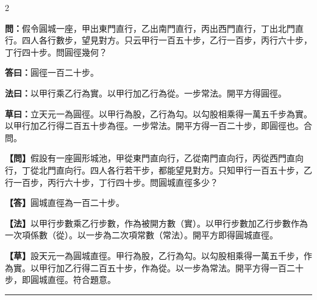 \documentclass[11pt,a4paper]{article}
\newcommand{\longline}{\noindent\rule{\textwidth}{0.4pt}}
\newcommand{\wenC}[1]{\par\noindent\textbf{\textcolor{probcolor}{問：}}{#1}\par}
\newcommand{\daC}[1]{\par\noindent\textbf{\textcolor{anscolor}{答曰：}}{#1}\par}
\newcommand{\fayueC}[1]{\par\noindent\textbf{\textcolor{methodcolor}{法曰：}}{#1}\par}
\newcommand{\caoyueC}[1]{\par\noindent\textbf{草曰：}{#1}\par}
\newcommand{\wenM}[1]{\par\noindent\textbf{\textcolor{probcolor}{【問】}}{#1}\par}
\newcommand{\daM}[1]{\par\noindent\textbf{\textcolor{anscolor}{【答】}}{#1}\par}
\newcommand{\fayueM}[1]{\par\noindent\textbf{\textcolor{methodcolor}{【法】}}{#1}\par}
\newcommand{\caoyueM}[1]{\par\noindent\textbf{【草】}{#1}\par}
\begin{document}
\begin{paracol}{2}

\wenC{假令圓城一座，甲出東門直行，乙出南門直行，丙出西門直行，丁出北門直行。四人各行數步，望見對方。只云甲行一百五十步，乙行一百步，丙行六十步，丁行四十步。問圓徑幾何？}

\daC{圓徑一百二十步。}

\fayueC{以甲行乘乙行為實。以甲行加乙行為從。一步常法。開平方得圓徑。}

\caoyueC{立天元一為圓徑。以甲行為股，乙行為勾。以勾股相乘得一萬五千步為實。以甲行加乙行得二百五十步為徑。一步常法。開平方得一百二十步，即圓徑也。合問。}

\switchcolumn

\wenM{假設有一座圓形城池，甲從東門直向行，乙從南門直向行，丙從西門直向行，丁從北門直向行。四人各行若干步，都能望見對方。只知甲行一百五十步，乙行一百步，丙行六十步，丁行四十步。問圓城直徑多少？}

\daM{圓城直徑為一百二十步。}

\fayueM{以甲行步數乘乙行步數，作為被開方數（實）。以甲行步數加乙行步數作為一次項係數（從）。以一步為二次項常數（常法）。開平方即得圓城直徑。}

\caoyueM{設天元一為圓城直徑。甲行為股，乙行為勾。以勾股相乘得一萬五千步，作為實。以甲行加乙行得二百五十步，作為從。以一步為常法。開平方得一百二十步，即圓城直徑。符合題意。}

\end{paracol}

\vspace{0.3cm}
\longline
\end{document}
